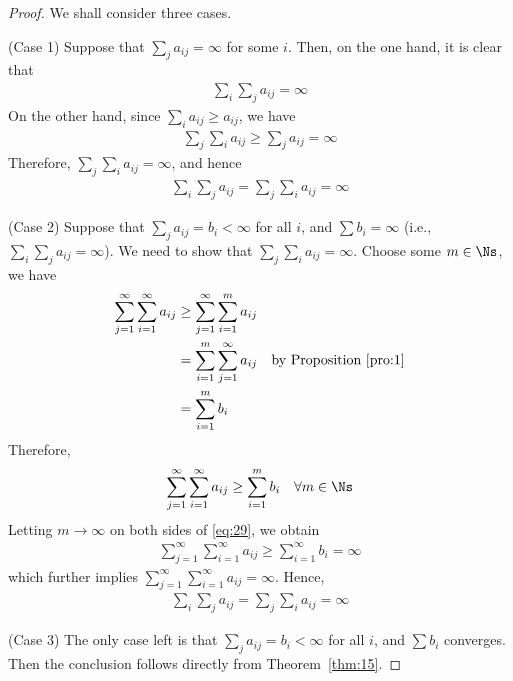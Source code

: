 \documentclass[thmcnt=section, 12pt]{elegantbook}
\begin{document}
\begin{proof}
    We shall consider three cases.

    \par (Case 1) Suppose that $\sum_{j} a_{ij} = \infty$ for some $i$. Then, on the one hand, it is clear that 
    \begin{align*}
        \sum_{i} \sum_{j} a_{ij} = \infty
    \end{align*}
    On the other hand, since $\sum_{i} a_{ij} \geq a_{ij}$, we have 
    \begin{align*}
        \sum_{j} \sum_{i} a_{ij} 
        \geq \sum_{j} a_{ij} = \infty
    \end{align*}
    Therefore, $\sum_{j} \sum_{i} a_{ij} = \infty$, and hence 
    \begin{align*}
        \sum_{i} \sum_{j} a_{ij} 
        = \sum_{j} \sum_{i} a_{ij}
        = \infty
    \end{align*}

    \par (Case 2) Suppose that $\sum_{j} a_{ij} = b_i < \infty$ for all $i$, and $\sum b_i = \infty$ (i.e., $\sum_i \sum_j a_{ij} = \infty$). We need to show that $\sum_j \sum_i a_{ij} = \infty$. Choose some $m \in \Ns$, we have 
    \begin{align*}
        \sum_{j=1}^\infty \sum_{i=1}^\infty a_{ij}
        &\geq \sum_{j=1}^\infty \sum_{i=1}^m a_{ij} \\ 
        &= \sum_{i=1}^m \sum_{j=1}^\infty a_{ij} 
        \quad \text{by Proposition~\ref{pro:1}} \\
        &= \sum_{i=1}^m b_i
    \end{align*}
    Therefore,
    \begin{align}
        \sum_{j=1}^\infty \sum_{i=1}^\infty a_{ij}
        \geq \sum_{i=1}^m b_i 
        \quad \forall m \in \Ns
        \label{eq:29}
    \end{align}
    Letting $m \to \infty$ on both sides of \eqref{eq:29}, we obtain 
    \begin{align*}
        \sum_{j=1}^\infty \sum_{i=1}^\infty a_{ij}
        \geq \sum_{i=1}^\infty b_i
        = \infty
    \end{align*}
    which further implies $\sum_{j=1}^\infty \sum_{i=1}^\infty a_{ij} = \infty$.
    Hence, 
    \begin{align*}
        \sum_{i} \sum_{j} a_{ij} 
        = \sum_{j} \sum_{i} a_{ij}
        = \infty
    \end{align*}

    \par (Case 3) The only case left is that $\sum_{j} a_{ij} = b_i < \infty$ for all $i$, and $\sum b_i$ converges. Then the conclusion follows directly from Theorem~\ref{thm:15}.
\end{proof}
\end{document}

